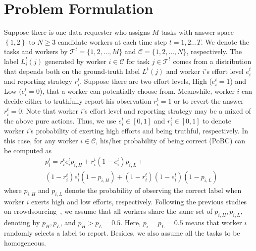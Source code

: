 \documentclass{article}
\begin{document}
\section{Problem Formulation}
Suppose there is one data requester who assigns $M$ tasks with answer space $\left\{1,2\right\}$ to $N \geq 3$ candidate workers at each time step $t=1,2\ldots T$.
We denote the tasks and workers by $\mathcal{T}^{t}=\{1,2,\ldots,M\}$ and $\mathcal{C}=\{1,2,\ldots,N\}$, respectively.
The label $L^{t}_{i}(j)$ generated by worker $i\in \mathcal{C}$ for task $j\in\mathcal{T}^{t}$ comes from a distribution that depends both on the ground-truth label $L^{t}(j)$ and worker $i$'s effort level $e^{t}_i$ and reporting strategy $r^{t}_i$.
Suppose there are two effort levels, High ($e^{t}_i=1$) and Low ($e^{t}_i=0$), that a worker can potentially choose from.
Meanwhile, worker $i$ can decide either to truthfully report his observation $r^{t}_i = 1$ or to revert the answer $r^{t}_i = 0$.
Note that worker $i$'s effort level and reporting strategy may be a mixed of the above pure actions.
Thus, we use $e^{t}_i\in[0,1]$ and $r^{t}_i\in[0,1]$ to denote worker $i$'s probability of exerting high efforts and being truthful, respectively.
In this case, for any worker $i\in\mathcal{C}$, his/her probability of being correct (PoBC) can be computed as
\begin{equation}
\begin{split}
&p^{t}_i=r^{t}_i e^{t}_i p_{i, H}+r^{t}_i (1-e^{t}_i) p_{i, L}+\\
&(1-r^{t}_i) e^{t}_i (1-p_{i, H})+(1-r^{t}_i) (1-e^{t}_i) (1-p_{i, L})
\end{split}
\end{equation}
where $p_{i, H}$ and $p_{i, L}$ denote the probability of observing the correct label when worker $i$ exerts high and low efforts, respectively.
Following the previous studies on crowdsourcing~\cite{dasgupta2013crowdsourced,liu2017sequential}, we assume that all workers share the same set of $p_{i, H}, p_{i, L}$, denoting by $p_H, p_L$, and $p_{H}>p_{L}= 0.5$.
Here, $p_i=p_{L}=0.5$ means that worker $i$ randomly selects a label to report.
Besides, we also assume all the tasks to be homogeneous.
\end{document}
